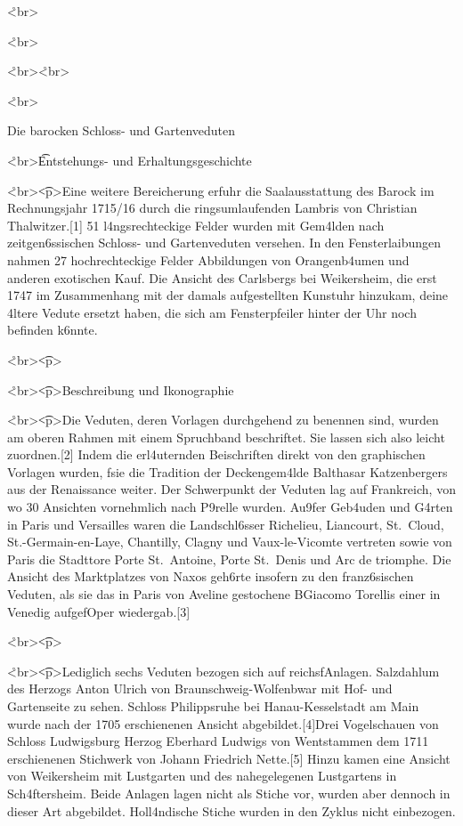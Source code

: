 \documentclass[
  a4paper,
]{book}
\begin{document}
\r<br\textgreater{}

\r<br\textgreater{}

\r<br\textgreater{}\r<br\textgreater{}

\r<br\textgreater{}

Die barocken Schloss- und Gartenveduten

\r<br\textgreater{}\t<h6>Entstehungs- und Erhaltungsgeschichte

\r<br\textgreater{}\t<p\textgreater Eine weitere Bereicherung erfuhr die
Saalausstattung des Barock im Rechnungsjahr 1715/16 durch die
ringsumlaufenden Lambris von Christian Thalwitzer.{[}1{]} 51
l\xa4ngsrechteckige Felder wurden mit Gem\xa4lden nach
zeitgen\xb6ssischen Schloss- und Gartenveduten versehen. In den
Fensterlaibungen nahmen 27 hochrechteckige Felder Abbildungen von
Orangenb\xa4umen und anderen exotischen K\xbcbelpflanzen auf.
Die Ansicht des Carlsbergs bei Weikersheim, die erst 1747 im
Zusammenhang mit der damals aufgestellten Kunstuhr hinzukam,
d\xbcrfte eine \xa4ltere Vedute ersetzt haben, die sich am
Fensterpfeiler hinter der Uhr noch befinden k\xb6nnte.

\r<br\textgreater{}\t<p\textgreater{}

\r<br\textgreater{}\t<p\textgreater{}Beschreibung und Ikonographie

\r<br\textgreater{}\t<p\textgreater Die Veduten, deren Vorlagen
durchgehend zu benennen sind, wurden am oberen Rahmen mit einem
Spruchband beschriftet. Sie lassen sich also leicht zuordnen.{[}2{]}
Indem die erl\xa4uternden Beischriften direkt von den graphischen
Vorlagen \xbcbernommen wurden, f\xbchrten sie die Tradition der
Deckengem\xa4lde Balthasar Katzenbergers aus der Renaissance weiter.
Der Schwerpunkt der Veduten lag auf Frankreich, von wo 30 Ansichten
vornehmlich nach P\xa9relle \xbcbernommen wurden. Au\x9fer
Geb\xa4uden und G\xa4rten in Paris und Versailles waren die
Landschl\xb6sser Richelieu, Liancourt, St.~Cloud,
St.-Germain-en-Laye, Chantilly, Clagny und Vaux-le-Vicomte vertreten
sowie von Paris die Stadttore Porte St.~Antoine, Porte St.~Denis und Arc
de triomphe. Die Ansicht des Marktplatzes von Naxos geh\xb6rte
insofern zu den franz\xb6sischen Veduten, als sie das in Paris von
Aveline gestochene B\xbchnenbild Giacomo Torellis einer in Venedig
aufgef\xbchrten Oper wiedergab.{[}3{]}

\r<br\textgreater{}\t<p\textgreater{}

\r<br\textgreater{}\t<p\textgreater Lediglich sechs Veduten bezogen sich
auf reichsf\xbcrstliche Anlagen. Salzdahlum des Herzogs Anton Ulrich
von Braunschweig-Wolfenb\xbcttel war mit Hof- und Gartenseite zu
sehen. Schloss Philippsruhe bei Hanau-Kesselstadt am Main wurde nach der
1705 erschienenen Ansicht abgebildet.{[}4{]}Drei Vogelschauen von
Schloss Ludwigsburg Herzog Eberhard Ludwigs von
W\xbcrttemberg entstammen dem 1711 erschienenen Stichwerk von Johann
Friedrich Nette.{[}5{]} Hinzu kamen eine Ansicht von Weikersheim mit
Lustgarten und des nahegelegenen Lustgartens in Sch\xa4ftersheim.
Beide Anlagen lagen nicht als Stiche vor, wurden aber dennoch in dieser
Art abgebildet. Holl\xa4ndische Stiche wurden in den Zyklus nicht
einbezogen.
\end{document}
